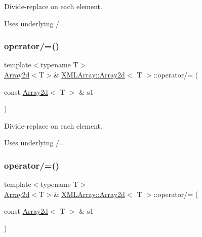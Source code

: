 Divide-\/replace on each element. 

Uses underlying /= \mbox{\label{classXMLArray_1_1Array2d_a704df3d7442ab68977e0caa8f8f059cd}} 
\subsubsection{\texorpdfstring{operator/=()}{operator/=()}\hspace{0.1cm}{\footnotesize\ttfamily [2/6]}}
{\footnotesize\ttfamily template$<$typename T$>$ \\
\mbox{\hyperlink{classXMLArray_1_1Array2d}{Array2d}}$<$T$>$\& \mbox{\hyperlink{classXMLArray_1_1Array2d}{X\+M\+L\+Array\+::\+Array2d}}$<$ T $>$\+::operator/= (\begin{DoxyParamCaption}\item[{const \mbox{\hyperlink{classXMLArray_1_1Array2d}{Array2d}}$<$ T $>$ \&}]{s1 }\end{DoxyParamCaption})\hspace{0.3cm}{\ttfamily [inline]}}



Divide-\/replace on each element. 

Uses underlying /= \mbox{\label{classXMLArray_1_1Array2d_a704df3d7442ab68977e0caa8f8f059cd}} 
\subsubsection{\texorpdfstring{operator/=()}{operator/=()}\hspace{0.1cm}{\footnotesize\ttfamily [3/6]}}
{\footnotesize\ttfamily template$<$typename T$>$ \\
\mbox{\hyperlink{classXMLArray_1_1Array2d}{Array2d}}$<$T$>$\& \mbox{\hyperlink{classXMLArray_1_1Array2d}{X\+M\+L\+Array\+::\+Array2d}}$<$ T $>$\+::operator/= (\begin{DoxyParamCaption}\item[{const \mbox{\hyperlink{classXMLArray_1_1Array2d}{Array2d}}$<$ T $>$ \&}]{s1 }\end{DoxyParamCaption})\hspace{0.3cm}{\ttfamily [inline]}}



